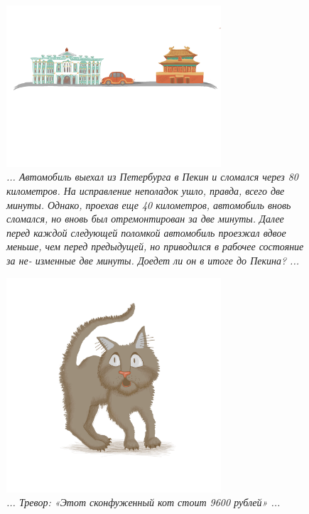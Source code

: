 \documentclass[10pt]{scrbook} \usepackage{modules/nonstahp_book}
\begin{document}
\begin{figure} \begin{center}
	\includegraphics[width=8cm]{figures/color/15}
	\caption{
             {\itshape ... Автомобиль выехал из Петербурга в Пекин и сломался через 80 километров. 
             На исправление неполадок ушло, правда, всего две минуты. Однако, проехав еще 40 километров, 
             автомобиль вновь сломался, но вновь был отремонтирован за две минуты. 
             Далее перед каждой следующей поломкой автомобиль проезжал вдвое меньше, чем перед 
             предыдущей, но приводился в рабочее состояние за не- изменные две минуты. 
             Доедет ли он в итоге до Пекина? ...}\\
             }
\end{center} \end{figure}


\begin{figure} \begin{center}
	\includegraphics[width=8cm]{figures/color/16}
	\caption{
             {\itshape ... Тревор: «Этот сконфуженный кот стоит 9600 рублей» ...}\\
             }
\end{center} \end{figure}
\end{document}
